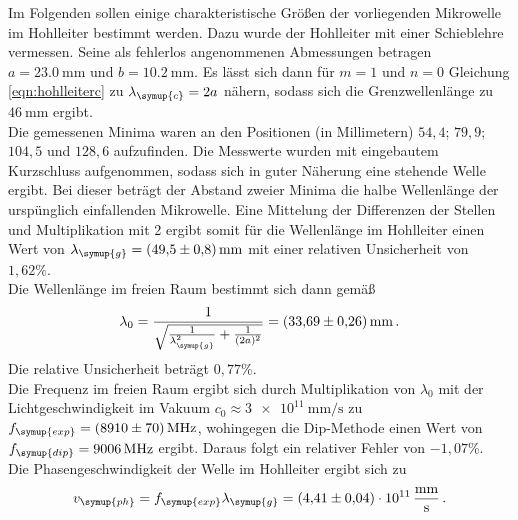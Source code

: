 Im Folgenden sollen einige charakteristische Größen der vorliegenden Mikrowelle im Hohlleiter bestimmt werden.
Dazu wurde der Hohlleiter mit einer Schieblehre vermessen. Seine als fehlerlos angenommenen Abmessungen betragen $a = \SI{23.0}{\milli\meter}$ und $b = \SI{10.2}{\milli\meter}$. Es lässt sich dann für $m=1$ und $n=0$ Gleichung \eqref{eqn:hohlleiterc} zu $\lambda_\symup{c} = 2a$ nähern, sodass sich die Grenzwellenlänge zu $\SI{46}{\milli\meter}$ ergibt.\\
Die gemessenen Minima waren an den Positionen (in Millimetern) $54{,}4$; $79{,}9$; $104{,}5$ und $128{,}6$ aufzufinden. Die Messwerte wurden mit eingebautem Kurzschluss aufgenommen, sodass sich in guter Näherung eine stehende Welle ergibt. Bei dieser beträgt der Abstand zweier Minima die halbe Wellenlänge der urspünglich einfallenden Mikrowelle. Eine Mittelung der Differenzen der Stellen und Multiplikation mit 2 ergibt somit für die Wellenlänge im Hohlleiter einen Wert von $\lambda_\symup{g} = \SI{49.5(8)}{\milli\meter}$ mit einer relativen Unsicherheit von $1{,}62\%$.\\
Die Wellenlänge im freien Raum bestimmt sich dann gemäß
\begin{equation*}
  \lambda_0 = \frac{1}{\sqrt{ \frac{1}{\lambda_\symup{g}^2} + \frac{1}{(2a)^2}}} = \SI{33.69(26)}{\milli\meter} \,.
\end{equation*}
Die relative Unsicherheit beträgt $0{,}77\%$.\\
Die Frequenz im freien Raum ergibt sich durch Multiplikation von $\lambda_0$ mit der Lichtgeschwindigkeit im Vakuum $c_0 \approx \SI{3e11}{\milli\meter\per\second}$ zu $f_\symup{exp} = \SI{8910(70)}{\mega\hertz}$, wohingegen die Dip-Methode einen Wert von $f_\symup{dip} = \SI{9006}{\mega\hertz}$ ergibt. Daraus folgt ein relativer Fehler von $-1{,}07\%$.\\
Die Phasengeschwindigkeit der Welle im Hohlleiter ergibt sich zu
\begin{equation*}
  v_\symup{ph} = f_\symup{exp} \lambda_\symup{g} = \SI{4.41(4)e+11}{\milli\meter\per\second} \,.
\end{equation*}


